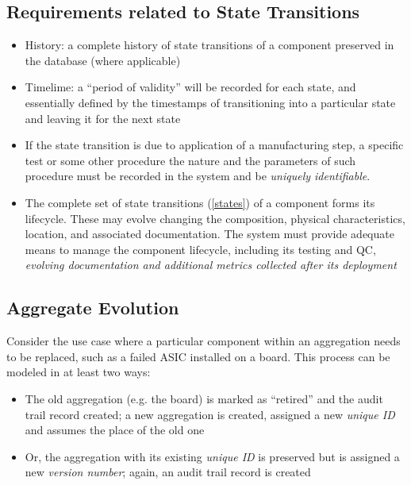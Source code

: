 \documentclass[pdftex,12pt,letter]{article}
\begin{document}
\subsection{Requirements related to State Transitions}
\label{history}
\begin{itemize}

\item History: a complete history of state transitions of a component  preserved in the database (where applicable)

\item Timelime: a ``period of validity'' will be recorded for each state, and essentially defined by the timestamps
of transitioning into a particular state and leaving it for the next state

\item If the state transition is due to application of a manufacturing step, a specific test or some other procedure
the nature and the parameters of such procedure must be recorded in the system and be \textit{uniquely identifiable}.

\item The complete set of state transitions (\ref{states}) of a component forms its lifecycle. These may
evolve changing the composition, physical characteristics, location, and associated documentation.
The system must provide adequate means to manage the component lifecycle, including its
testing and QC, \textit{evolving documentation and additional metrics collected after its deployment}

\end{itemize}


\subsection{Aggregate Evolution}
\label{evolution}
Consider the use case where a particular component within an aggregation needs to be replaced,
such as a failed ASIC installed on a board. This process can be modeled in at least two ways:

\begin{itemize}

\item The old aggregation (e.g. the board) is marked as ``retired'' and the audit trail record created; a new aggregation is
created, assigned a new \textit{unique ID} and assumes the place of the old one

\item Or, the aggregation with its existing \textit{unique ID} is preserved but is assigned a new \textit{version number};
again, an audit trail record is created

\end{itemize}
\end{document}

